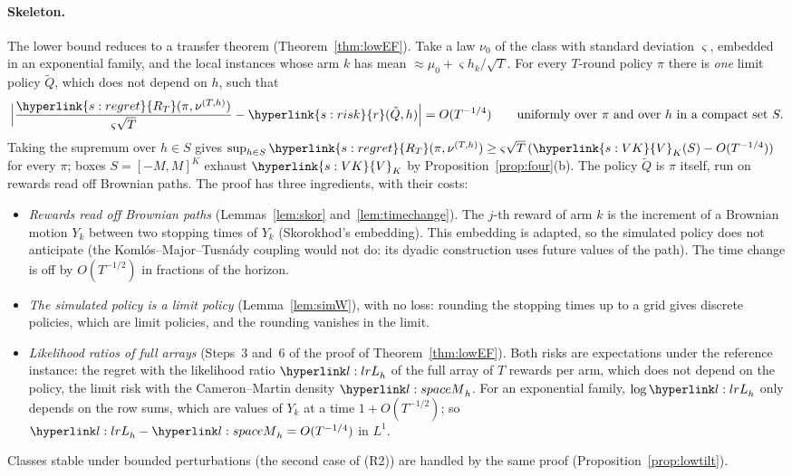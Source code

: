 \documentclass[11pt]{article}
\DeclareRobustCommand{\sy}[2]{{\hyperlink{#1}{#2}}}
\newcommand{\1}{\mathbf{1}}
\newcommand{\RT}{\sy{s:regret}{R_T}}
\newcommand{\rk}{\sy{s:risk}{r}}
\newcommand{\VK}{\sy{s:VK}{V}}
\begin{document}
\paragraph{Skeleton.} The lower bound reduces to a transfer theorem (Theorem~\ref{thm:lowEF}). Take a law $\nu_0$ of the class with standard deviation
$\varsigma$, embedded in an exponential family, and the local instances whose arm $k$ has mean $\approx\mu_0+\varsigma h_k/\sqrt T$. For every $T$-round policy $\pi$
there is \emph{one} limit policy $\tilde Q$, which does not depend on $h$, such that
\[
\Big|\frac{\RT(\pi,\nu^{(T,h)})}{\varsigma\sqrt T}-\rk(\tilde Q,h)\Big|=O(T^{-1/4})\qquad\text{uniformly over }\pi\text{ and over }h\text{ in a compact set }S.
\]
Taking the supremum over $h\in S$ gives $\sup_{h\in S}\RT(\pi,\nu^{(T,h)})\ge\varsigma\sqrt T\,(\VK_K(S)-O(T^{-1/4}))$ for every $\pi$; boxes $S=[-M,M]^K$ exhaust
$\VK_K$ by Proposition~\ref{prop:four}(b). The policy $\tilde Q$ is $\pi$ itself, run on rewards read off Brownian paths. The proof has three ingredients, with their costs:
\begin{itemize}
\item \emph{Rewards read off Brownian paths} (Lemmas~\ref{lem:skor} and~\ref{lem:timechange}). The $j$-th reward of arm $k$ is the increment of a Brownian motion $Y_k$
between two stopping times of $Y_k$ (Skorokhod's embedding). This embedding is adapted, so the simulated policy does not anticipate (the Komlós--Major--Tusnády coupling
would not do: its dyadic construction uses future values of the path). The time change is off by $O(T^{-1/2})$ in fractions of the horizon.
\item \emph{The simulated policy is a limit policy} (Lemma~\ref{lem:simW}), with no loss: rounding the stopping times up to a grid gives discrete policies, which are
limit policies, and the rounding vanishes in the limit.
\item \emph{Likelihood ratios of full arrays} (Steps~3 and~6 of the proof of Theorem~\ref{thm:lowEF}). Both risks are expectations under the reference instance: the regret
with the likelihood ratio $\lL_h$ of the full array of $T$ rewards per arm, which does not depend on the policy, the limit risk with the Cameron--Martin density
$\lM_h$. For an exponential family, $\log\lL_h$ only depends on the row sums, which are values of $Y_k$ at a time $1+O(T^{-1/2})$; so $\lL_h-\lM_h=O(T^{-1/4})$ in $L^1$.
\end{itemize}
Classes stable under bounded perturbations (the second case of (R2)) are handled by the same proof (Proposition~\ref{prop:lowtilt}).
\end{document}
